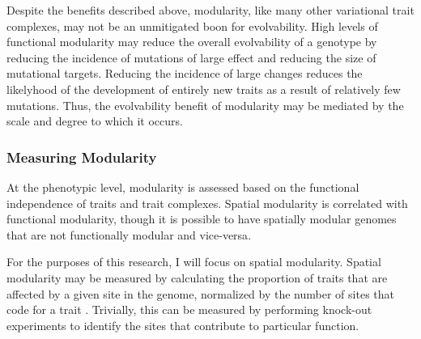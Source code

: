 \documentclass[PhD]{msu-thesis}
\begin{document}
Despite the benefits described above, modularity, like many other variational trait complexes, may not be an unmitigated boon for evolvability. High levels of functional modularity may reduce the overall evolvability of a genotype by reducing the incidence of mutations of large effect and reducing the size of mutational targets\cite{hansen_is_2003}. Reducing the incidence of large changes reduces the likelyhood of the development of entirely new traits as a result of relatively few mutations. Thus, the evolvability benefit of modularity may be mediated by the scale and degree to which it occurs.



\subsubsection{Measuring Modularity}

At the phenotypic level, modularity is assessed based on the functional independence of traits and trait complexes. Spatial modularity is correlated with functional modularity, though it is possible to have spatially modular genomes that are not functionally modular and vice-versa\cite{pavlicev_model_2012,mezey_is_2000}.  

For the purposes of this research, I will focus on spatial modularity. Spatial modularity may be measured by calculating the proportion of traits that are affected by a given site in the genome, normalized by the number of sites that code for a trait \cite{misevic_sexual_2006}. Trivially, this can be measured by performing knock-out experiments to identify the sites that contribute to particular function.
\end{document}
